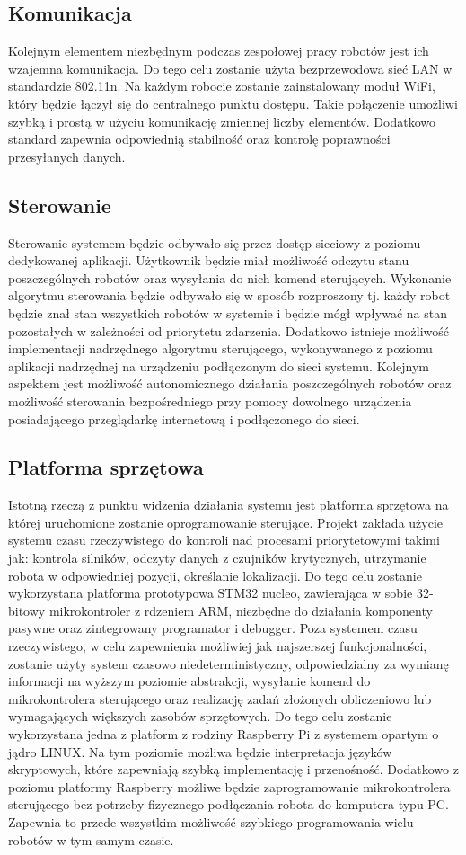\documentclass[a4paper, 12pt]{article}
\begin{document}
\subsection{Komunikacja}
Kolejnym elementem niezbędnym podczas zespołowej pracy robotów jest ich wzajemna komunikacja. Do tego celu zostanie użyta bezprzewodowa sieć LAN w standardzie 802.11n. Na każdym robocie zostanie zainstalowany moduł WiFi, który będzie łączył się do centralnego punktu dostępu. Takie połączenie umożliwi szybką i prostą w użyciu komunikację zmiennej liczby elementów. Dodatkowo standard zapewnia odpowiednią stabilność oraz kontrolę poprawności przesyłanych danych. 

\subsection{Sterowanie}
Sterowanie systemem będzie odbywało się przez dostęp sieciowy z poziomu dedykowanej aplikacji. Użytkownik będzie miał możliwość odczytu stanu poszczególnych robotów oraz wysyłania do nich komend sterujących. Wykonanie algorytmu sterowania będzie odbywało się w sposób rozproszony tj. każdy robot będzie znał stan wszystkich robotów w systemie i będzie mógł wpływać na stan pozostałych w zależności od priorytetu zdarzenia. Dodatkowo istnieje możliwość implementacji nadrzędnego algorytmu sterującego, wykonywanego z poziomu aplikacji nadrzędnej na urządzeniu podłączonym do sieci systemu. Kolejnym aspektem jest możliwość autonomicznego działania poszczególnych robotów oraz możliwość sterowania bezpośredniego przy pomocy dowolnego urządzenia posiadającego przeglądarkę internetową i podłączonego do sieci. 

\subsection{Platforma sprzętowa}
Istotną rzeczą z punktu widzenia działania systemu jest platforma sprzętowa na której uruchomione zostanie oprogramowanie sterujące. Projekt zakłada użycie systemu czasu rzeczywistego do kontroli nad procesami priorytetowymi takimi jak: kontrola silników, odczyty danych z czujników krytycznych, utrzymanie robota w odpowiedniej pozycji, określanie lokalizacji. Do tego celu zostanie wykorzystana platforma prototypowa STM32 nucleo, zawierająca w sobie 32-bitowy mikrokontroler z rdzeniem ARM, niezbędne do działania komponenty pasywne oraz zintegrowany programator i debugger. Poza systemem czasu rzeczywistego, w celu zapewnienia możliwiej jak najszerszej funkcjonalności, zostanie użyty system czasowo niedeterministyczny, odpowiedzialny za wymianę informacji na wyższym poziomie abstrakcji, wysyłanie komend do mikrokontrolera sterującego oraz realizację zadań złożonych obliczeniowo lub wymagających większych zasobów sprzętowych. Do tego celu zostanie wykorzystana jedna z platform z rodziny Raspberry Pi z systemem opartym o jądro LINUX. Na tym poziomie możliwa będzie interpretacja języków skryptowych, które zapewniają szybką implementację i przenośność. Dodatkowo z poziomu platformy Raspberry możliwe będzie zaprogramowanie mikrokontrolera sterującego bez potrzeby fizycznego podłączania robota do komputera typu PC. Zapewnia to przede wszystkim możliwość szybkiego programowania wielu robotów w tym samym czasie. 
\end{document}
